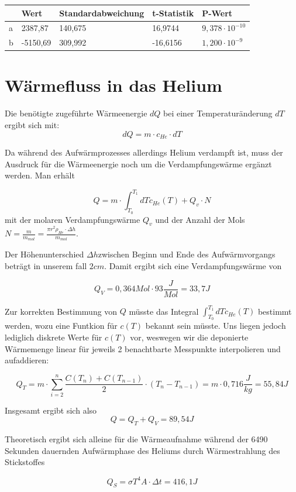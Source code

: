 \documentclass[bigchapter,colorback,accentcolor=tud4b,linedtoc,11pt]{tudreport}
\begin{document}
\begin{center}
  \begin{tabular}{l|llll}
      & Wert     & Standardabweichung & t-Statistik & P-Wert                 \\ \hline
    a & 2387,87  & 140,675            & 16,9744     & $9,378 \cdot 10^{-10}$ \\
    b & -5150,69 & 309,992            & -16,6156    & $1,200 \cdot 10^{-9}$  \\
  \end{tabular}
\end{center}
\section{Wärmefluss in das Helium}
Die benötigte zugeführte Wärmeenergie $dQ$ bei einer Temperaturänderung $dT$
ergibt sich mit:
$$dQ = m \cdot c_{He} \cdot dT$$

Da während des Aufwärmprozesses allerdings Helium verdampft ist, muss der
Ausdruck für die Wärmeenergie noch um die Verdampfungswärme ergänzt werden. Man
erhält

$$Q = m \cdot \int_{T_0}^{T_1}dT c_{He}(T) + Q_v \cdot N$$
mit der molaren Verdampfungswärme $Q_v$ und der Anzahl der Mols $N =
\frac{m}{m_{mol}} = \frac{\pi r^2 \rho_{He}\cdot \Delta h}{m_{mol}}$.

Der Höhenunterschied $\Delta h$zwischen Beginn und Ende des Aufwärmvorgangs
beträgt in unserem fall $2 cm$. Damit ergibt sich eine Verdampfungswärme von 

$$Q_V = 0,364 Mol \cdot 93\frac{J}{Mol} = 33,7J$$

Zur korrekten Bestimmung von $Q$ müsste das Integral $\int_{T_0}^{T_1}dT
c_{He}(T)$ bestimmt werden, wozu eine Funtkion für $c(T)$ bekannt sein
müsste. Uns liegen jedoch lediglich diskrete Werte für $c(T)$ vor, weswegen wir die
deponierte Wärmemenge linear für jeweils 2 benachtbarte Messpunkte interpolieren
und aufaddieren:

$$Q_T = m \cdot \sum \limits_{i=2}^n \frac{C(T_n) + C(T_{n-1})}{2} \cdot (T_n -
  T_{n-1}) = m \cdot 0,716 \frac{J}{kg} = 55,84 J$$

Insgesamt ergibt sich also 
$$Q = Q_T + Q_V = 89,54J$$

Theoretisch ergibt sich alleine für die Wärmeaufnahme während der 6490 Sekunden
dauernden Aufwärmphase des Heliums durch Wärmestrahlung des Stickstoffes

$$Q_S = \sigma T^4 A \cdot \Delta t = 416,1J$$
\end{document}
